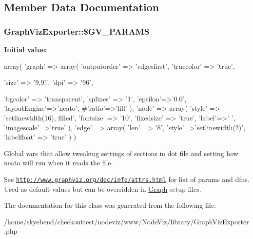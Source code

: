 \subsection{Member Data Documentation}
\hypertarget{classGraphVizExporter_a227940f38a3a387e9225d563e1170578}{
\subsubsection[{\$GV\_\-PARAMS}]{\setlength{\rightskip}{0pt plus 5cm}GraphVizExporter::\$GV\_\-PARAMS}}
\label{classGraphVizExporter_a227940f38a3a387e9225d563e1170578}
{\bfseries Initial value:}
\begin{DoxyCode}
 array(
        'graph' => array(
            'outputorder' => 'edgesfirst',  
            'truecolor' => 'true',
            
            'size' => '9,9!',
            'dpi' => '96',
            
            'bgcolor' => 'transparent',
            'splines' => '1',
            'epsilon'=>'0.0',
            'layoutEngine'=>'neato',
            #'ratio'=>'fill'
        ),
        'node' => array(
            'style' => 'setlinewidth(16), filled',
            'fontsize' => '10',
            'fixedsize' => 'true', 
            'label'=>' ',
            'imagescale'=>'true'
        ),
        'edge' => array(
            'len' => '8',
            'style'=>'setlinewidth(2)',
            'labelfloat' => 'true'
        )
    )
\end{DoxyCode}


Global vars that allow tweaking settings of sections in dot file and setting how neato will run when it reads the file. 

See \href{http://www.graphviz.org/doc/info/attrs.html}{\tt http://www.graphviz.org/doc/info/attrs.html} for list of params and dfns. Used as default values but can be overridden in \hyperlink{classGraph}{Graph} setup files. 

The documentation for this class was generated from the following file:\begin{DoxyCompactItemize}
\item 
/home/skyebend/checkouttest/nodeviz/www/NodeViz/library/GraphVizExporter.php\end{DoxyCompactItemize}
